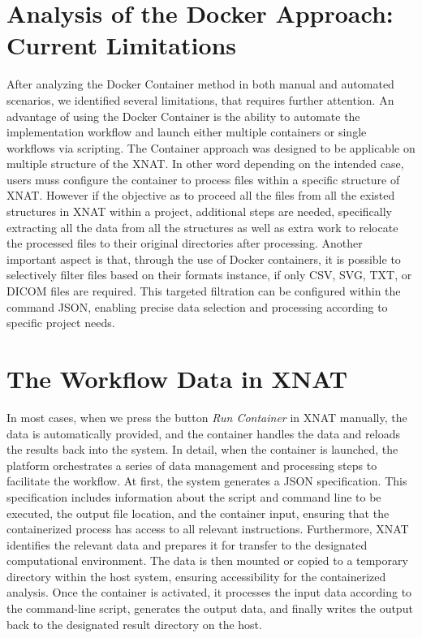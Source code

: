 \section{Analysis of the Docker Approach: Current Limitations}

After analyzing the Docker Container method in both manual and automated scenarios, we identified several limitations, that requires further attention.
An advantage of using the Docker Container is the ability to automate the implementation workflow and launch either multiple containers or single workflows via scripting.
The Container approach was designed to be applicable on multiple structure of the XNAT. In other word depending on the intended case, users muss configure the container to process files within a specific structure of XNAT. However if the objective as to proceed all the files from all the existed structures in XNAT within a project, additional steps are needed, specifically extracting all the data from all the structures as well as extra work to relocate the processed files to their original directories after processing. Another important aspect is that, through the use of Docker containers, it is possible to selectively filter files based on their formats instance, if only CSV, SVG, TXT, or DICOM files are required. This targeted filtration can be configured within the command JSON, enabling precise data selection and processing according to specific project needs.

\section{The Workflow Data in XNAT}

In most cases, when we press the button \textit{Run Container} in XNAT manually, the data is automatically provided, and the container handles the data and reloads the results back into the system.  
In detail, when the container is launched, the platform orchestrates a series of data management and processing steps to facilitate the workflow. At first, the system generates a JSON specification. This specification includes information about the script and command line to be executed, the output file location, and the container input, ensuring that the containerized process has access to all relevant instructions.  
Furthermore, XNAT identifies the relevant data and prepares it for transfer to the designated computational environment. The data is then mounted or copied to a temporary directory within the host system, ensuring accessibility for the containerized analysis. Once the container is activated, it processes the input data according to the command-line script, generates the output data, and finally writes the output back to the designated result directory on the host.  

